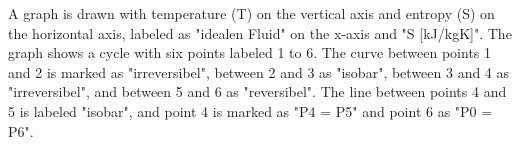 A graph is drawn with temperature (T) on the vertical axis and entropy (S) on the horizontal axis, labeled as "idealen Fluid" on the x-axis and "S [kJ/kgK]". The graph shows a cycle with six points labeled 1 to 6. The curve between points 1 and 2 is marked as "irreversibel", between 2 and 3 as "isobar", between 3 and 4 as "irreversibel", and between 5 and 6 as "reversibel". The line between points 4 and 5 is labeled "isobar", and point 4 is marked as "P4 = P5" and point 6 as "P0 = P6".